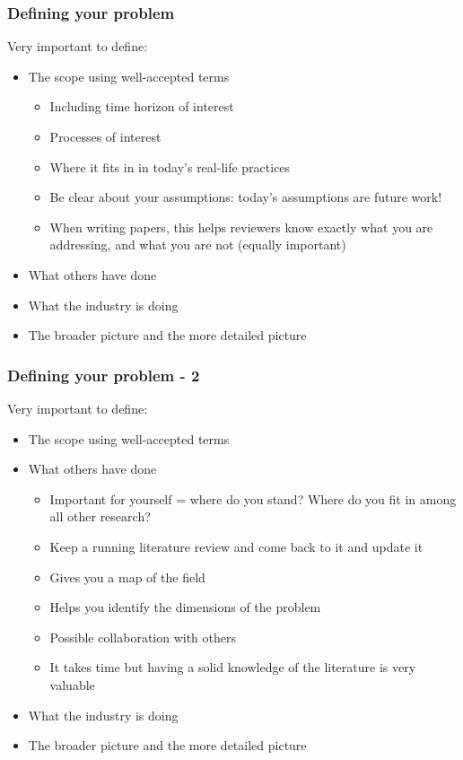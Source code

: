\documentclass[screen, aspectratio=43]{beamer}
\begin{document}
\begin{frame}
  \frametitle{Defining your problem}
Very important to define:
\begin{itemize}
\item The scope using well-accepted terms
  \begin{itemize}
  \item Including time horizon of interest
  \item Processes of interest
  \item Where it fits in in today's real-life practices
  \item Be clear about your assumptions: today's assumptions are future work!
  \item When writing papers, this helps reviewers know exactly what you are addressing, and what you are not (equally important)
  \end{itemize}
\item What others have done
\item What the industry is doing
\item The broader picture and the more detailed picture
\end{itemize}
\end{frame}

\begin{frame}
\frametitle{Defining your problem - 2}
Very important to define:
\begin{itemize}
\item The scope using well-accepted terms
\item What others have done
  \begin{itemize}
  \item Important for yourself = where do you stand? Where do you fit in among all other research?
  \item Keep a running literature review and come back to it and update it
  \item Gives you a map of the field
  \item Helps you identify the dimensions of the problem
  \item Possible collaboration with others
  \item It takes time but having a solid knowledge of the literature is very valuable
  \end{itemize}
\item What the industry is doing
\item The broader picture and the more detailed picture
\end{itemize}    
\end{frame}
\end{document}
